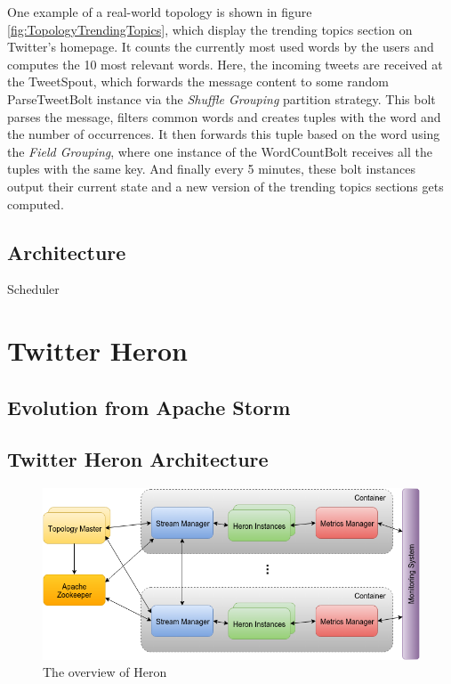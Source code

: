 \documentclass[conference]{IEEEtran}
\begin{document}
One example of a real-world topology is shown in figure \ref{fig:TopologyTrendingTopics}, which display the trending topics section on Twitter's homepage.
It counts the currently most used words by the users and computes the 10 most relevant words.
Here, the incoming tweets are received at the TweetSpout, which forwards the message content to some random ParseTweetBolt instance via the \emph{Shuffle Grouping} partition strategy.
This bolt parses the message, filters common words and creates tuples with the word and the number of occurrences.
It then forwards this tuple based on the word using the \emph{Field Grouping}, where one instance of the WordCountBolt receives all the tuples with the same key.
And finally every 5 minutes, these bolt instances output their current state and a new version of the trending topics sections gets computed.

\subsection{Architecture}

\lipsum[2-4]

Scheduler

\cite{StormTwitter}

\section{Twitter Heron}
\label{sec:TwitterHeron}

\lipsum[2-4]


\subsection{Evolution from Apache Storm}
\label{sec:EvolutionFromApacheStorm}

\lipsum[2-4]


\subsection{Twitter Heron Architecture}
\label{sec:TwitterHeronArchitecture}

\lipsum[2-4]


\begin{figure}[!tp]
    \centering
    \includegraphics[scale=0.45]{figures/HeronOverview}
    \caption{The overview of Heron}
    \label{fig:HeronOverview}
\end{figure}
\end{document}
